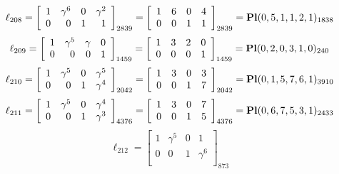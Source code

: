 \documentclass{article}
\begin{document}
{$$
\ell_{208} = 
\left[
\begin{array}{*{4}{r}}
1 & \gamma^{6} & 0 & \gamma^{2}\\
0 & 0 & 1 & 1\\
\end{array}
\right]
_{2839}
=
\left[
\begin{array}{*{4}c}
1  & 6  & 0  & 4\\
0  & 0  & 1  & 1\\
\end{array}
\right]_{2839}
={\rm\bf Pl}(0,5,1,1,2,1 )_{1838}$$
$$
\ell_{209} = 
\left[
\begin{array}{*{4}{r}}
1 & \gamma^{5} & \gamma  & 0\\
0 & 0 & 0 & 1\\
\end{array}
\right]
_{1459}
=
\left[
\begin{array}{*{4}c}
1  & 3  & 2  & 0\\
0  & 0  & 0  & 1\\
\end{array}
\right]_{1459}
={\rm\bf Pl}(0,2,0,3,1,0 )_{240}$$
$$
\ell_{210} = 
\left[
\begin{array}{*{4}{r}}
1 & \gamma^{5} & 0 & \gamma^{5}\\
0 & 0 & 1 & \gamma^{4}\\
\end{array}
\right]
_{2042}
=
\left[
\begin{array}{*{4}c}
1  & 3  & 0  & 3\\
0  & 0  & 1  & 7\\
\end{array}
\right]_{2042}
={\rm\bf Pl}(0,1,5,7,6,1 )_{3910}$$
$$
\ell_{211} = 
\left[
\begin{array}{*{4}{r}}
1 & \gamma^{5} & 0 & \gamma^{4}\\
0 & 0 & 1 & \gamma^{3}\\
\end{array}
\right]
_{4376}
=
\left[
\begin{array}{*{4}c}
1  & 3  & 0  & 7\\
0  & 0  & 1  & 5\\
\end{array}
\right]_{4376}
={\rm\bf Pl}(0,6,7,5,3,1 )_{2433}$$
$$
\ell_{212} = 
\left[
\begin{array}{*{4}{r}}
1 & \gamma^{5} & 0 & 1\\
0 & 0 & 1 & \gamma^{6}\\
\end{array}
\right]
_{873}
$$}
\end{document}
